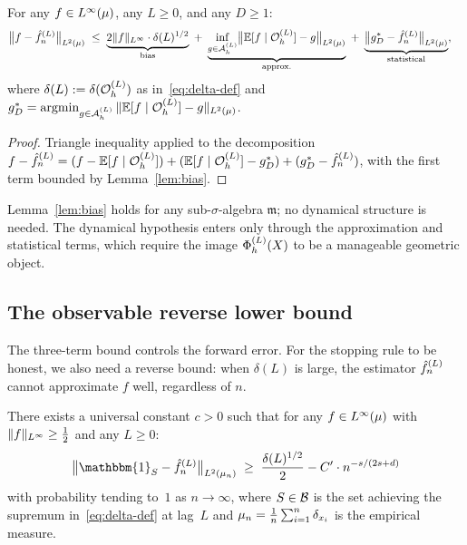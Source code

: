 \begin{lemma}
\label{lem:three-term}
For any $f \in L^{\infty}(\mu)$, any $L \geq 0$, and any $D \geq 1$:
\begin{align}
  \bigl\|f - \hat{f}_n^{(L)}\bigr\|_{L^{2}(\mu)}
  &\;\leq\;
    \underbrace{2\|f\|_{L^{\infty}} \cdot \delta(L)^{1/2}}_{\text{bias}}
  \;+\;
    \underbrace{\inf_{g \in \mathcal{A}_h^{(L)}}\bigl\|
      \mathbb{E}[f \mid \mathcal{O}_h^{(L)}] - g
    \bigr\|_{L^{2}(\mu)}}_{\text{approx.}}
  \;+\;
    \underbrace{\bigl\|g_D^* - \hat{f}_n^{(L)}\bigr\|_{L^{2}(\mu)}}_{\text{statistical}},
  \label{eq:three-term}
\end{align}
where $\delta(L) := \delta(\mathcal{O}_h^{(L)})$ as in~\eqref{eq:delta-def} and
$g_D^* = \operatorname{argmin}_{g \in \mathcal{A}_h^{(L)}} \|\mathbb{E}[f \mid \mathcal{O}_h^{(L)}] - g\|_{L^{2}(\mu)}$.
\end{lemma}

\begin{proof}
Triangle inequality applied to the decomposition
$f - \hat{f}_n^{(L)} = (f - \mathbb{E}[f \mid \mathcal{O}_h^{(L)}]) + (\mathbb{E}[f \mid \mathcal{O}_h^{(L)}] - g_D^*)
+ (g_D^* - \hat{f}_n^{(L)})$, with the first term bounded by Lemma~\ref{lem:bias}.
\end{proof}

\begin{remark}[Scope]
Lemma~\ref{lem:bias} holds for any sub-$\sigma$-algebra $\mathfrak{m}$; no
dynamical structure is needed.
The dynamical hypothesis enters only through the approximation and statistical
terms, which require the image $\Phi_h^{(L)}(X)$ to be a manageable geometric object.
\end{remark}

\subsection{The observable reverse lower bound}
\label{subsec:reverse}

The three-term bound controls the forward error.
For the stopping rule to be honest, we also need a reverse bound: when
$\delta(L)$ is large, the estimator $\hat{f}_n^{(L)}$ cannot approximate $f$ well,
regardless of $n$.

\begin{lemma}
\label{lem:reverse}
There exists a universal constant $c > 0$ such that for any $f \in L^{\infty}(\mu)$
with $\|f\|_{L^{\infty}} \geq \frac{1}{2}$ and any $L \geq 0$:
\[
  \bigl\|\mathbbm{1}_S - \fhat\bigr\|_{\Lp{2}(\mun)}
  \;\geq\;
  \frac{\delta(L)^{1/2}}{2} - C' \cdot n^{-s/(2s+d)}
\]
with probability tending to~$1$ as $n \to \infty$, where $S \in \mathcal{B}$ is
the set achieving the supremum in~\eqref{eq:delta-def} at lag~$L$ and
$\mu_n = \frac{1}{n}\sum_{i=1}^n \delta_{x_i}$ is the empirical measure.
\end{lemma}


